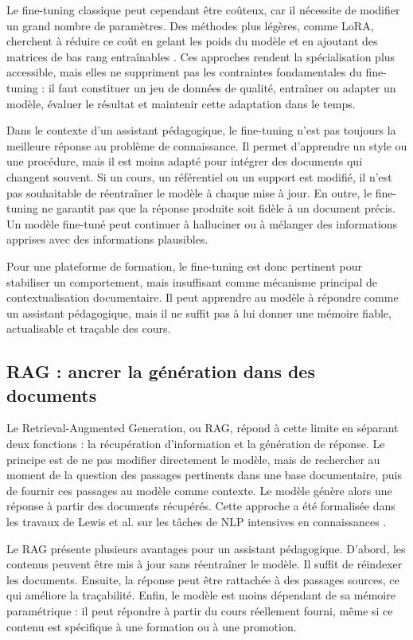 Le fine-tuning classique peut cependant être coûteux, car il nécessite de modifier un
grand nombre de paramètres. Des méthodes plus légères, comme LoRA, cherchent à
réduire ce coût en gelant les poids du modèle et en ajoutant des matrices de bas rang
entraînables \cite{hu2021lora}. Ces approches rendent la spécialisation plus accessible,
mais elles ne suppriment pas les contraintes fondamentales du fine-tuning : il faut
constituer un jeu de données de qualité, entraîner ou adapter un modèle, évaluer le
résultat et maintenir cette adaptation dans le temps.

Dans le contexte d'un assistant pédagogique, le fine-tuning n'est pas toujours la meilleure
réponse au problème de connaissance. Il permet d'apprendre un style ou une procédure,
mais il est moins adapté pour intégrer des documents qui changent souvent. Si un cours,
un référentiel ou un support est modifié, il n'est pas souhaitable de réentraîner le modèle
à chaque mise à jour. En outre, le fine-tuning ne garantit pas que la réponse produite soit
fidèle à un document précis. Un modèle fine-tuné peut continuer à halluciner ou à
mélanger des informations apprises avec des informations plausibles.

Pour une plateforme de formation, le fine-tuning est donc pertinent pour stabiliser un
comportement, mais insuffisant comme mécanisme principal de contextualisation
documentaire. Il peut apprendre au modèle à répondre comme un assistant pédagogique,
mais il ne suffit pas à lui donner une mémoire fiable, actualisable et traçable des cours.

\subsection{RAG : ancrer la génération dans des documents}

Le Retrieval-Augmented Generation, ou RAG, répond à cette limite en séparant deux
fonctions : la récupération d'information et la génération de réponse. Le principe est de
ne pas modifier directement le modèle, mais de rechercher au moment de la question des
passages pertinents dans une base documentaire, puis de fournir ces passages au modèle
comme contexte. Le modèle génère alors une réponse à partir des documents récupérés.
Cette approche a été formalisée dans les travaux de Lewis et al. sur les tâches de NLP
intensives en connaissances \cite{lewis2020retrieval}.

Le RAG présente plusieurs avantages pour un assistant pédagogique. D'abord, les contenus
peuvent être mis à jour sans réentraîner le modèle. Il suffit de réindexer les documents.
Ensuite, la réponse peut être rattachée à des passages sources, ce qui améliore la
traçabilité. Enfin, le modèle est moins dépendant de sa mémoire paramétrique : il peut
répondre à partir du cours réellement fourni, même si ce contenu est spécifique à une
formation ou à une promotion.

